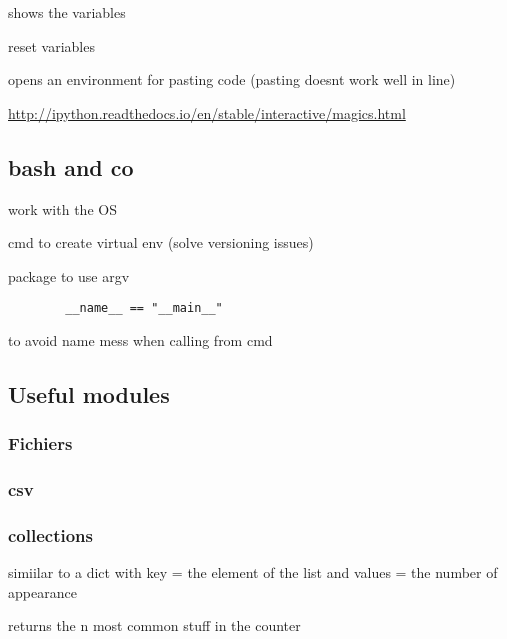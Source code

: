			 shows the variables

			 reset variables

			 opens an environment for pasting code (pasting doesnt work well in line)

			\url{http://ipython.readthedocs.io/en/stable/interactive/magics.html}
	

	\subsection{bash and co}

		 work with the OS

		 cmd to create virtual env (solve versioning issues)

		 package to use argv

		\begin{lstlisting}
		__name__ == "__main__" 
		\end{lstlisting}  
		to avoid name mess when calling from cmd

	\subsection{Useful modules}

		\subsubsection{Fichiers}


			\subsubsection{csv}



		\subsubsection{collections}


			 simiilar to a dict with key = the element of the list and values = the number of appearance

			 returns the n most common stuff in the counter

